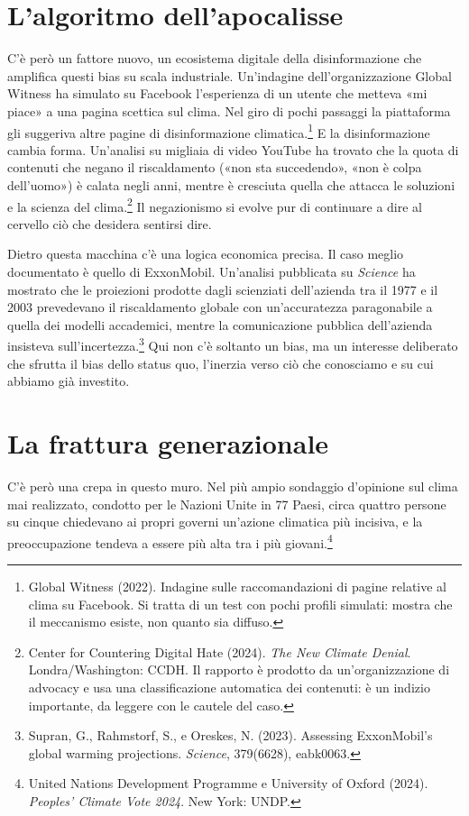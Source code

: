 \section{L'algoritmo dell'apocalisse}

C'\`{e} per\`{o} un fattore nuovo, un ecosistema digitale della disinformazione che amplifica questi bias su scala industriale. Un'indagine dell'organizzazione Global Witness ha simulato su Facebook l'esperienza di un utente che metteva «mi piace» a una pagina scettica sul clima. Nel giro di pochi passaggi la piattaforma gli suggeriva altre pagine di disinformazione climatica.\footnote{Global Witness (2022). Indagine sulle raccomandazioni di pagine relative al clima su Facebook. Si tratta di un test con pochi profili simulati: mostra che il meccanismo esiste, non quanto sia diffuso.} E la disinformazione cambia forma. Un'analisi su migliaia di video YouTube ha trovato che la quota di contenuti che negano il riscaldamento («non sta succedendo», «non è colpa dell'uomo») è calata negli anni, mentre è cresciuta quella che attacca le soluzioni e la scienza del clima.\footnote{Center for Countering Digital Hate (2024). \textit{The New Climate Denial}. Londra/Washington: CCDH. Il rapporto è prodotto da un'organizzazione di advocacy e usa una classificazione automatica dei contenuti: è un indizio importante, da leggere con le cautele del caso.} Il negazionismo si evolve pur di continuare a dire al cervello ci\`{o} che desidera sentirsi dire.

Dietro questa macchina c'\`{e} una logica economica precisa. Il caso meglio documentato è quello di ExxonMobil. Un'analisi pubblicata su \textit{Science} ha mostrato che le proiezioni prodotte dagli scienziati dell'azienda tra il 1977 e il 2003 prevedevano il riscaldamento globale con un'accuratezza paragonabile a quella dei modelli accademici, mentre la comunicazione pubblica dell'azienda insisteva sull'incertezza.\footnote{Supran, G., Rahmstorf, S., e Oreskes, N. (2023). Assessing ExxonMobil's global warming projections. \textit{Science}, 379(6628), eabk0063.} Qui non c'\`{e} soltanto un bias, ma un interesse deliberato che sfrutta il bias dello status quo, l'inerzia verso ci\`{o} che conosciamo e su cui abbiamo gi\`{a} investito.

\section{La frattura generazionale}

C'\`{e} per\`{o} una crepa in questo muro. Nel più ampio sondaggio d'opinione sul clima mai realizzato, condotto per le Nazioni Unite in 77 Paesi, circa quattro persone su cinque chiedevano ai propri governi un'azione climatica più incisiva, e la preoccupazione tendeva a essere più alta tra i più giovani.\footnote{United Nations Development Programme e University of Oxford (2024). \textit{Peoples' Climate Vote 2024}. New York: UNDP.}

